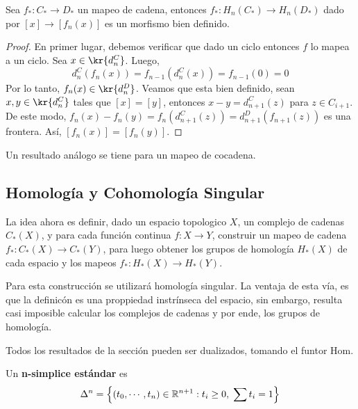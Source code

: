 \documentclass{article}
\begin{document}
\begin{lema}
    Sea $f_{*}:C_{*}\to D_{*}$ un mapeo de cadena, entonces $f_{*}:H_{n}(C_{*})\to H_{n}(D_{*})$
    dado por $[x]\to [f_{n}(x)]$ es un morfismo bien definido.
\end{lema}
\begin{proof}
    En primer lugar, debemos verificar que dado un ciclo entonces $f$ lo mapea a un ciclo. 
    Sea $x\in\kr{d_{n}^{C}}$. Luego,
    \begin{equation*}
        d_{n}^{C}(f_{n}(x))=f_{n-1}(d_{n}^{C}(x))=f_{n-1}(0)=0
    \end{equation*}
    Por lo tanto, $f_{n}(x)\in\kr{d_{n}^{D}}$. Veamos que esta bien definido, sean 
    $x,y\in\kr{d_{n}^{C}}$ tales que $[x]=[y]$, entonces $x-y=d_{n+1}^{C}(z)$ para $z\in C_{i+1}$.
    De este modo, $f_{n}(x)-f_{n}(y)=f_{n}(d_{n+1}^{C}(z))=d_{n+1}^{D}(f_{n+1}(z))$ es una 
    frontera. Así, $[f_{n}(x)]=[f_{n}(y)]$.
\end{proof}

\noindent Un resultado análogo se tiene para un mapeo de cocadena.

\subsection{Homología y Cohomología Singular}
\noindent La idea ahora es definir, dado un espacio topologico $X$, un complejo de cadenas 
$C_{*}(X)$, y para cada función continua $f:X\to Y$, construir un mapeo de cadena $f_{*}:C_{*}(X)
\to C_{*}(Y)$, para luego obtener los grupos de homología $H_{*}(X)$ de cada espacio y los mapeos
$f_{*}:H_{*}(X)\to H_{*}(Y)$.

\noindent Para esta construcción se utilizará homología singular. La ventaja de esta vía, es que
la definicón es una proppiedad instrínseca del espacio, sin embargo, resulta casi imposible 
calcular los complejos de cadenas y por ende, los grupos de homología.

\noindent Todos los resultados de la sección pueden ser dualizados, tomando el funtor Hom.

\begin{dfn}
    Un \textbf{n-simplice estándar} es
    \begin{equation*}
        \Delta^{n}=\left\{
            (t_{0},\cdots,t_{n})\in\mathbb{R}^{n+1}:t_{i}\geq0,\hspace{1mm}\sum t_{i}=1
        \right\}
    \end{equation*}
\end{dfn}
\end{document}
